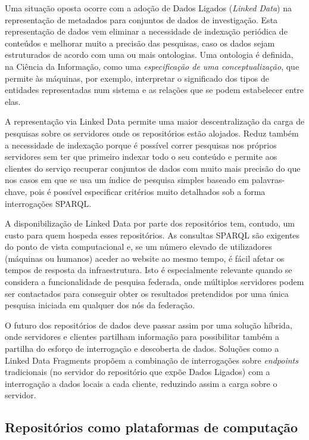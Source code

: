 \documentclass[sigconf,nonacm]{acmart}
\begin{document}
Uma situação oposta ocorre com a adoção de Dados Ligados (\textit{Linked Data}) na representação de metadados para conjuntos de dados de investigação. Esta representação de dados vem eliminar a necessidade de indexação periódica de conteúdos e melhorar muito a precisão das pesquisas, caso os dados sejam estruturados de acordo com uma ou mais ontologias. Uma ontologia é definida, na Ciência da Informação, como uma \textit{especificação de uma conceptualização}\cite{gruber1995toward}, que permite às máquinas, por exemplo, interpretar o significado dos tipos de entidades representadas num sistema e as relações que se podem estabelecer entre elas.

A representação via Linked Data permite uma maior descentralização da carga de pesquisas sobre os servidores onde os repositórios estão alojados. Reduz também a necessidade de indexação porque é possível correr pesquisas nos próprios servidores sem ter que primeiro indexar todo o seu conteúdo e permite aos clientes do serviço recuperar conjuntos de dados com muito mais precisão do que nos casos em que se usa um índice de pesquisa simples baseado em palavras-chave, pois é possível especificar critérios muito detalhados sob a forma interrogações SPARQL.

A disponibilização de Linked Data por parte dos repositórios tem, contudo, um custo para quem hospeda esses repositórios. As consultas SPARQL são exigentes do ponto de vista computacional e, se um número elevado de utilizadores (máquinas ou humanos) aceder ao website ao mesmo tempo, é fácil afetar os tempos de resposta da infraestrutura. Isto é especialmente relevante quando se considera a funcionalidade de pesquisa federada, onde múltiplos servidores podem ser contactados para conseguir obter os resultados pretendidos por uma única pesquisa iniciada em qualquer dos nós da federação.

O futuro dos repositórios de dados deve passar assim por uma solução híbrida, onde servidores e clientes partilham informação para possibilitar também a partilha do esforço de interrogação e descoberta de dados. Soluções como a Linked Data Fragments\cite{VERBORGH2016184} propõem a combinação de interrogações sobre \textit{endpoints} tradicionais (no servidor do repositório que expõe Dados Ligados) com a interrogação a dados locais a cada cliente, reduzindo assim a carga sobre o servidor.

\subsection{Repositórios como plataformas de computação}
\end{document}
